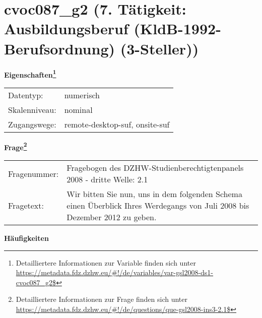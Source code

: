 
    \setcounter{footnote}{0}

    \vspace*{-1.8cm}
	\section{cvoc087\_g2 (7. Tätigkeit: Ausbildungsberuf (KldB-1992-Berufsordnung) (3-Steller))}
	\label{section:cvoc087_g2}



    \vspace*{0.5cm}
    \noindent\textbf{Eigenschaften\footnote{Detailliertere Informationen zur Variable finden sich unter
		\url{https://metadata.fdz.dzhw.eu/\#!/de/variables/var-gsl2008-ds1-cvoc087_g2$}}}\\
	\begin{tabularx}{\hsize}{@{}lX}
	Datentyp: & numerisch \\
	Skalenniveau: & nominal \\
	Zugangswege: &
	  remote-desktop-suf, 
	  onsite-suf
 \\
    \end{tabularx}



				\vspace*{0.5cm}
                \noindent\textbf{Frage\footnote{Detailliertere Informationen zur Frage finden sich unter
		              \url{https://metadata.fdz.dzhw.eu/\#!/de/questions/que-gsl2008-ins3-2.1$}}}\\
				\begin{tabularx}{\hsize}{@{}lX}
					Fragenummer: &
					  Fragebogen des DZHW-Studienberechtigtenpanels 2008 - dritte Welle:
					  2.1
 \\
					Fragetext: & Wir bitten Sie nun, uns in dem folgenden Schema einen Überblick Ihres Werdegangs von Juli 2008 bis Dezember 2012 zu geben. \\
				\end{tabularx}





        		\vspace*{0.5cm}
                \noindent\textbf{Häufigkeiten}

